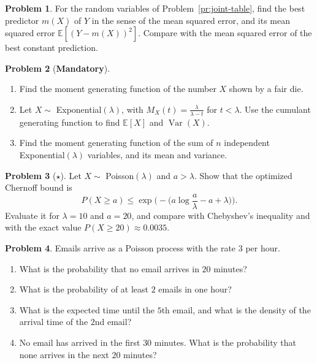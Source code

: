 \documentclass[11pt]{article}
\theoremstyle{definition}
\newtheorem{problem}{Problem}[section]
\newcommand{\mandatory}{\textcolor{red!70!black}{\textbf{Mandatory}}}
\newcommand{\E}{\mathbb{E}}
\DeclareMathOperator{\Var}{Var}
\begin{document}
\begin{problem}\label{pr:best-predictor}
    For the random variables of Problem~\ref{pr:joint-table}, find the best predictor $m(X)$ of $Y$ in the sense of the mean squared error, and its mean squared error $\E[(Y - m(X))^2]$. Compare with the mean squared error of the best constant prediction.
\end{problem}

\begin{problem}[\mandatory]\label{pr:mgf-practice}
    \begin{enumerate}[label=(\alph*)]
        \item Find the moment generating function of the number $X$ shown by a fair die.
        \item Let $X \sim$ Exponential$(\lambda)$, with $M_X(t) = \frac{\lambda}{\lambda - t}$ for $t < \lambda$. Use the cumulant generating function to find $\E[X]$ and $\Var(X)$.
        \item Find the moment generating function of the sum of $n$ independent Exponential$(\lambda)$ variables, and its mean and variance.
    \end{enumerate}
\end{problem}

\begin{problem}[$\star$]\label{pr:poisson-chernoff}
    Let $X \sim$ Poisson$(\lambda)$ and $a > \lambda$. Show that the optimized Chernoff bound is
    \[P(X \geq a) \leq \exp\Big(-\Big(a\log\frac{a}{\lambda} - a + \lambda\Big)\Big).\]
    Evaluate it for $\lambda = 10$ and $a = 20$, and compare with Chebyshev's inequality and with the exact value $P(X \geq 20) \approx 0.0035$.
\end{problem}

\begin{problem}\label{pr:poisson-process}
    Emails arrive as a Poisson process with the rate $3$ per hour.
    \begin{enumerate}[label=(\alph*)]
        \item What is the probability that no email arrives in $20$ minutes?
        \item What is the probability of at least $2$ emails in one hour?
        \item What is the expected time until the $5$th email, and what is the density of the arrival time of the $2$nd email?
        \item No email has arrived in the first $30$ minutes. What is the probability that none arrives in the next $20$ minutes?
    \end{enumerate}
\end{problem}
\end{document}
